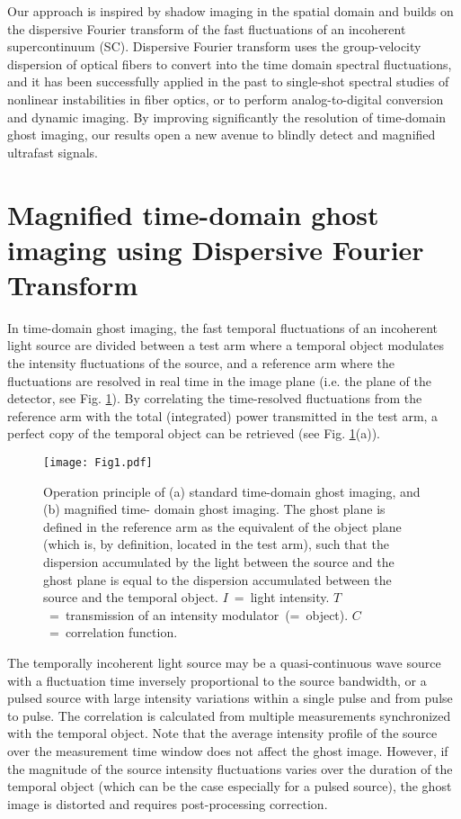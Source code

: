 \documentclass[aip,graphicx]{revtex4-1}
\begin{document}
%
Our approach is inspired by shadow imaging in the spatial domain and builds on the dispersive Fourier transform of the fast fluctuations of an incoherent supercontinuum (SC). Dispersive Fourier transform uses the group-velocity dispersion of optical fibers to convert into the time domain spectral fluctuations\cite{Goda13}, and it has been successfully applied in the past to single-shot spectral studies of nonlinear instabilities in fiber optics\cite{Solli12}, or to perform analog-to-digital conversion and dynamic imaging\cite{Goda13}. By improving significantly the resolution of time-domain ghost imaging, our results open a new avenue to blindly detect and magnified ultrafast signals. 

\section{Magnified time-domain ghost imaging using Dispersive Fourier Transform}
In time-domain ghost imaging, the fast temporal fluctuations of an incoherent light source are divided between a test arm where a temporal object modulates the intensity fluctuations of the source, and a reference arm where the fluctuations are resolved in real time in the image plane\cite{Ryczkowski16} (i.e. the plane of the detector, see Fig. \ref{fig:Operation_principle}). By correlating the time-resolved fluctuations from the reference arm with the total (integrated) power transmitted in the test arm, a perfect copy of the temporal object can be retrieved (see Fig. \ref{fig:Operation_principle}(a)).
\begin{figure}
	\texttt{[image: Fig1.pdf]}
	\caption{\label{fig:Operation_principle} Operation principle of (a) standard time-domain ghost imaging, and (b) magnified time- domain ghost imaging. The ghost plane is defined in the reference arm as the equivalent of the object plane (which is, by definition, located in the test arm), such that the dispersion accumulated by the light between the source and the ghost plane is equal to the dispersion accumulated between the source and the temporal object. {$I$~=~light} intensity. {$T$~=~transmission} of an intensity modulator~(=~object). {$C$~=~correlation} function. }
\end{figure}
The temporally incoherent light source may be a quasi-continuous wave source with a fluctuation time inversely proportional to the source bandwidth, or a pulsed source with large intensity variations within a single pulse and from pulse to pulse\cite{Shirai10}. The correlation is calculated from multiple measurements synchronized with the temporal object. Note that the average intensity profile of the source over the measurement time window does not affect the ghost image. However, if the magnitude of the source intensity fluctuations varies over the duration of the temporal object (which can be the case especially for a pulsed source), the ghost image is distorted and requires post-processing correction\cite{Shirai10}.
\end{document}
